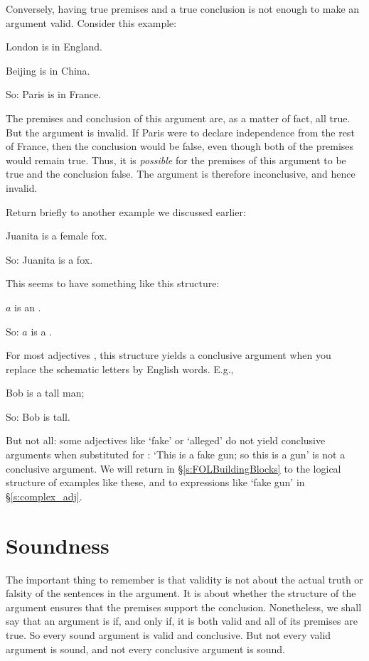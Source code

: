 Conversely, having true premises and a true conclusion is not enough to make an argument valid. Consider this example:
	\begin{earg}
		\item[] London is in England.
		\item[] Beijing is in China.
		\item[So:] Paris is in France.
	\end{earg}
The premises and conclusion of this argument are, as a matter of fact, all true. But the argument is invalid. If Paris were to declare independence from the rest of France, then the conclusion would be false, even though both of the premises would remain true. Thus, it is \emph{possible} for the premises of this argument to be true and the conclusion false. The argument is therefore inconclusive, and hence invalid.

Return briefly to another example we discussed earlier: \begin{earg}
 		\item[] Juanita is a female fox.
 		\item[So:] Juanita is a fox.
 	\end{earg} This seems to have something like this structure:
\begin{earg}
 		\item[] $a$ is an \; .
 		\item[So:] $a$ is a .
 	\end{earg} For most adjectives , this structure yields a conclusive argument when you replace the schematic letters by English words. E.g., \begin{earg}
 		\item[] Bob is a tall man;
 		\item[So:] Bob is tall.
 	\end{earg} But not all: some adjectives like `fake' or `alleged' do not yield conclusive arguments when substituted for : `This is a fake gun; so this is a gun' is not a conclusive argument. We will return in §\ref{s:FOLBuildingBlocks} to the logical structure of examples like these, and to expressions like `fake gun' in §\ref{s:complex_adj}.


\section{Soundness}

The important thing to remember is that validity is not about the actual truth or falsity of the sentences in the argument. It is about whether the structure of the argument ensures that the premises support the conclusion. Nonetheless, we shall say that an argument is  if, and only if, it is both valid and all of its premises are true. So every sound argument is valid and conclusive. But not every valid argument is sound, and not every conclusive argument is sound.


